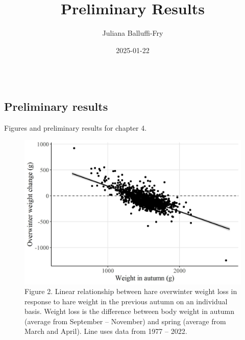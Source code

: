 \documentclass[
]{article}
\title{Preliminary Results}
\author{Juliana Balluffi-Fry}
\date{2025-01-22}
\begin{document}
\maketitle

\begin{verbatim}
\end{verbatim}

\hypertarget{preliminary-results}{%
\subsection{Preliminary results}\label{preliminary-results}}

Figures and preliminary results for chapter 4.

\begin{figure}
\centering
\includegraphics{Output/Figures/hodges_figure.jpeg}
\caption{Figure 2. Linear relationship between hare overwinter weight
loss in response to hare weight in the previous autumn on an individual
basis. Weight loss is the difference between body weight in autumn
(average from September -- November) and spring (average from March and
April). Line uses data from 1977 -- 2022.}
\end{figure}
\end{document}
